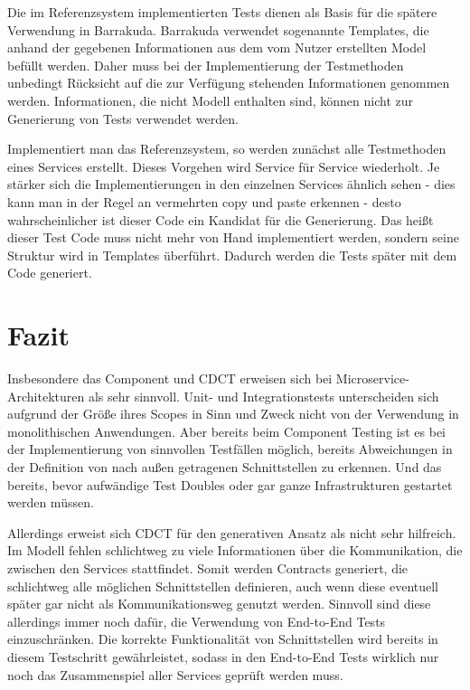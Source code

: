\documentclass[12pt,a4paper,bibliography=totocnumbered,listof=totocnumbered]{scrartcl}
\begin{document}
Die im Referenzsystem implementierten Tests dienen als Basis für die spätere Verwendung in Barrakuda. Barrakuda verwendet sogenannte Templates, die anhand der gegebenen Informationen aus dem vom Nutzer erstellten Model befüllt werden. Daher muss bei der Implementierung der Testmethoden unbedingt Rücksicht auf die zur Verfügung stehenden Informationen genommen werden. Informationen, die nicht Modell enthalten sind, können nicht zur Generierung von Tests verwendet werden.

Implementiert man das Referenzsystem, so werden zunächst alle Testmethoden eines Services erstellt. Dieses Vorgehen wird Service für Service wiederholt. Je stärker sich die Implementierungen in den einzelnen Services ähnlich sehen - dies kann man in der Regel an vermehrten copy und paste erkennen - desto wahrscheinlicher ist dieser Code ein Kandidat für die Generierung. Das heißt dieser Test Code muss nicht mehr von Hand implementiert werden, sondern seine Struktur wird in Templates überführt. Dadurch werden die Tests später mit dem Code generiert.

\section{Fazit}\label{ch:fazit}

Insbesondere das Component und \acf{CDCT} erweisen sich bei Microservice-Architekturen als sehr sinnvoll. Unit- und Integrationstests unterscheiden sich aufgrund der Größe ihres Scopes in Sinn und Zweck nicht von der Verwendung in monolithischen Anwendungen. Aber bereits beim Component Testing ist es bei der Implementierung von sinnvollen Testfällen möglich, bereits Abweichungen in der Definition von nach außen getragenen Schnittstellen zu erkennen. Und das bereits, bevor aufwändige Test Doubles oder gar ganze Infrastrukturen gestartet werden müssen.

Allerdings erweist sich \ac{CDCT} für den generativen Ansatz als nicht sehr hilfreich. Im Modell fehlen schlichtweg zu viele Informationen über die Kommunikation, die zwischen den Services stattfindet. Somit werden Contracts generiert, die schlichtweg alle möglichen Schnittstellen definieren, auch wenn diese eventuell später gar nicht als Kommunikationsweg genutzt werden. Sinnvoll sind diese allerdings immer noch dafür, die Verwendung von End-to-End Tests einzuschränken. Die korrekte Funktionalität von Schnittstellen wird bereits in diesem Testschritt gewährleistet, sodass in den End-to-End Tests wirklich nur noch das Zusammenspiel aller Services geprüft werden muss.
\end{document}
